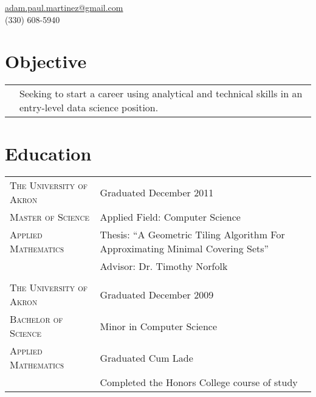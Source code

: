 \documentclass[letterpaper,10pt]{article} %
\begin{document}
\pagestyle{empty} %


\par{\medskip\par} %

\begin{center}
\href{mailto:adam.paul.martinez@gmail.com}{adam.paul.martinez@gmail.com} \\
(330) 608-5940
\end{center}

\section{Objective}
\begin{center}
\begin{tabular}{R{4.25cm}L{11.25cm}}
& Seeking to start a career using analytical and technical skills in an entry-level data science position.
\end{tabular}
\end{center}


\section{Education}

\begin{center}
\begin{tabular}{R{4.25cm}L{11.25cm}}

\textsc{The University of Akron} & Graduated December 2011\\
\textsc{Master of Science} & Applied Field: Computer Science\\
\textsc{Applied Mathematics} &  Thesis: ``A Geometric Tiling Algorithm For Approximating Minimal Covering Sets''\\
&  Advisor: Dr. Timothy Norfolk\\
 \\


\textsc{The University of Akron} & Graduated December 2009\\
\textsc{Bachelor of Science} & Minor in Computer Science\\
\textsc{Applied Mathematics} &  Graduated Cum Lade\\
&  Completed the Honors College course of study

\end{tabular}
\end{center}
\end{document}
